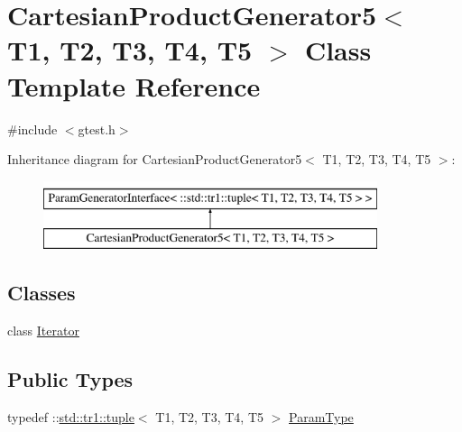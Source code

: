 \hypertarget{classtesting_1_1internal_1_1CartesianProductGenerator5}{\section{\-Cartesian\-Product\-Generator5$<$ \-T1, \-T2, \-T3, \-T4, \-T5 $>$ \-Class \-Template \-Reference}
\label{db/d7f/classtesting_1_1internal_1_1CartesianProductGenerator5}
}


{\ttfamily \#include $<$gtest.\-h$>$}

\-Inheritance diagram for \-Cartesian\-Product\-Generator5$<$ \-T1, \-T2, \-T3, \-T4, \-T5 $>$\-:\begin{figure}[H]
\begin{center}
\leavevmode
\includegraphics[height=2.000000cm]{db/d7f/classtesting_1_1internal_1_1CartesianProductGenerator5}
\end{center}
\end{figure}
\subsection*{\-Classes}
\begin{DoxyCompactItemize}
\item 
class \hyperlink{classtesting_1_1internal_1_1CartesianProductGenerator5_1_1Iterator}{\-Iterator}
\end{DoxyCompactItemize}
\subsection*{\-Public \-Types}
\begin{DoxyCompactItemize}
\item 
typedef \-::\hyperlink{classstd_1_1tr1_1_1tuple}{std\-::tr1\-::tuple}$<$ \-T1, \*
\-T2, \-T3, \-T4, \-T5 $>$ \hyperlink{classtesting_1_1internal_1_1CartesianProductGenerator5_a39880336d68d34bdc77e7e8726d38a91}{\-Param\-Type}
\end{DoxyCompactItemize}

